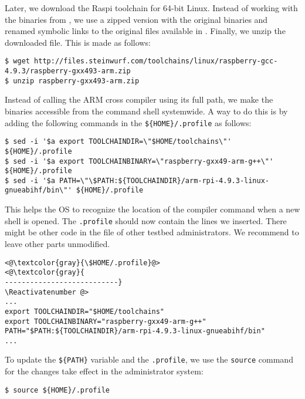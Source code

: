 Later, we download the \ac{Raspi} toolchain for 64-bit Linux.
Instead of working with the binaries from \cite{2016rpitoolchain},
we use a zipped version with the original binaries and renamed symbolic
links to the original files available in
\cite{2016steinwurfrpitoolchain}. Finally, we unzip the downloaded file.
This is made as follows:

\begin{lstlisting}[]
$ wget http://files.steinwurf.com/toolchains/linux/raspberry-gcc-4.9.3/raspberry-gxx493-arm.zip
$ unzip raspberry-gxx493-arm.zip
\end{lstlisting}
\FloatBarrier
\vspace{-5mm}

Instead of calling the ARM cross compiler using its full path, we make
the binaries accessible from the command shell systemwide. A way to do
this is by adding the following commands in the \texttt{\$\{HOME\}/.profile}
as follows:

\begin{lstlisting}[]
$ sed -i '$a export TOOLCHAINDIR=\"$HOME/toolchains\"' ${HOME}/.profile
$ sed -i '$a export TOOLCHAINBINARY=\"raspberry-gxx49-arm-g++\"' ${HOME}/.profile
$ sed -i '$a PATH=\"\$PATH:${TOOLCHAINDIR}/arm-rpi-4.9.3-linux-gnueabihf/bin\"' ${HOME}/.profile
\end{lstlisting}
\FloatBarrier
\vspace{-5mm}

This helps the \ac{OS} to recognize the location of the compiler
command when a new shell is opened. The \texttt{.profile} should now
contain the lines we inserted. There might be other
code in the file of other testbed administrators. We recommend to leave
other parts unmodified.
\Suppressnumber\begin{lstlisting}[]
<@\textcolor{gray}{\$HOME/.profile}@>
<@\textcolor{gray}{
---------------------------}
\Reactivatenumber @>
...
export TOOLCHAINDIR="$HOME/toolchains"
export TOOLCHAINBINARY="raspberry-gxx49-arm-g++"
PATH="$PATH:${TOOLCHAINDIR}/arm-rpi-4.9.3-linux-gnueabihf/bin"
...
\end{lstlisting}
\FloatBarrier
\vspace{-5mm}

To update the \texttt{\$\{PATH\}} variable and the \texttt{.profile}, we
use the \texttt{source} command for the changes take effect in the
administrator system:
\begin{lstlisting}[]
$ source ${HOME}/.profile
\end{lstlisting}
\FloatBarrier
\vspace{-5mm}


